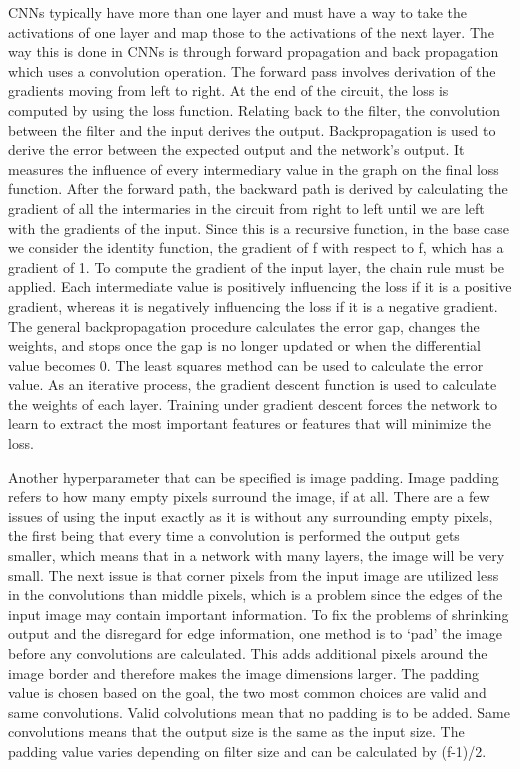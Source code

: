 \documentclass[10pt,twocolumn]{article}
\begin{document}
CNNs typically have more than one layer and must have a way to take the activations of one layer and map those to the activations of the next layer. The way this is done in CNNs is through forward propagation and back propagation which uses a convolution operation. The forward pass involves derivation of the gradients moving from left to right. At the end of the circuit, the loss is computed by using the loss function. Relating back to the filter, the convolution between the filter and the input derives the output. Backpropagation is used to derive the error between the expected output and the network’s output. It measures the influence of every intermediary value in the graph on the final loss function. After the forward path, the backward path is derived by calculating the gradient of all the intermaries in the circuit from right to left until we are left with the gradients of the input. Since this is a recursive function, in the base case we consider the identity function, the gradient of f with respect to f, which has a gradient of 1. To compute the gradient of the input layer, the chain rule must be applied. Each intermediate value is positively influencing the loss if it is a positive gradient, whereas it is negatively influencing the loss if it is a negative gradient. The general backpropagation procedure calculates the error gap, changes the weights, and stops once the gap is no longer updated or when the differential value becomes 0. The least squares method can be used to calculate the error value. As an iterative process, the gradient descent function is used to calculate the weights of each layer. Training under gradient descent forces the network to learn to extract the most important features or features that will minimize the loss. 

Another hyperparameter that can be specified is image padding. Image padding refers to how many empty pixels surround the image, if at all. There are a few issues of using the input exactly as it is without any surrounding empty pixels, the first being that every time a convolution is performed the output gets smaller, which means that in a network with many layers, the image will be very small. The next issue is that corner pixels from the input image are utilized less in the convolutions than middle pixels, which is a problem since the edges of the input image may contain important information. To fix the problems of shrinking output and the disregard for edge information, one method is to ‘pad’ the image before any convolutions are calculated. This adds additional pixels around the image border and therefore makes the image dimensions larger. The padding value is chosen based on the goal, the two most common choices are valid and same convolutions. Valid colvolutions mean that no padding is to be added. Same convolutions means that the output size is the same as the input size. The padding value varies depending on filter size and can be calculated by (f-1)/2. 
\end{document}
